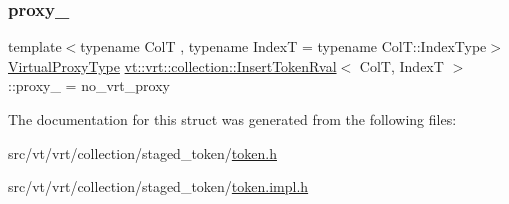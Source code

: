 \subsubsection{\texorpdfstring{proxy\+\_\+}{proxy\_}}
{\footnotesize\ttfamily template$<$typename ColT , typename IndexT  = typename Col\+T\+::\+Index\+Type$>$ \\
\hyperlink{namespacevt_a1b417dd5d684f045bb58a0ede70045ac}{Virtual\+Proxy\+Type} \hyperlink{structvt_1_1vrt_1_1collection_1_1_insert_token_rval}{vt\+::vrt\+::collection\+::\+Insert\+Token\+Rval}$<$ ColT, IndexT $>$\+::proxy\+\_\+ = no\+\_\+vrt\+\_\+proxy\hspace{0.3cm}{\ttfamily [private]}}



The documentation for this struct was generated from the following files\+:\begin{DoxyCompactItemize}
\item 
src/vt/vrt/collection/staged\+\_\+token/\hyperlink{token_8h}{token.\+h}\item 
src/vt/vrt/collection/staged\+\_\+token/\hyperlink{token_8impl_8h}{token.\+impl.\+h}\end{DoxyCompactItemize}
